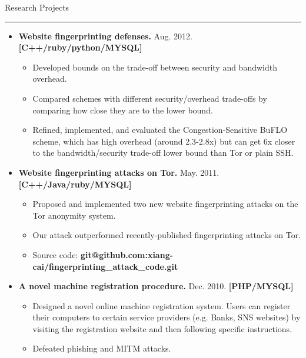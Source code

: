 \documentclass[11pt,oneside]{article}
\newenvironment{ressection}[1]{
	{\fontfamily{phv}\selectfont\Large#1}
	
	\vspace{-8pt} \rule{\textwidth}{.5pt}
	
	\vspace{-4pt}
	\begin{itemize}
	\vspace{.5pt}
}{
	\end{itemize}
}
\newcommand{\resitem}[1]{
	\vspace{2pt}
	\item \begin{flushleft} #1 \end{flushleft}
}
\begin{document}
\begin{ressection}{Research Projects}

	\resitem{\textbf{Website fingerprinting defenses.} Aug.
		2012. \hfill\textbf{[C++/ruby/python/MYSQL]} 
		\vspace{-2pt}
		\begin{small}
		
		\begin{itemize}
		\item
		Developed bounds on the trade-off between security and
		bandwidth overhead.
		\item
		Compared schemes with different
		security/overhead trade-offs by comparing how close they are
		to the lower bound. 
		\item
		Refined, implemented, and evaluated
		the Congestion-Sensitive BuFLO scheme, which has high overhead (around 2.3-2.8x) but can
		get 6x closer to the bandwidth/security trade-off lower bound
		than Tor or plain SSH.
		\end{itemize}
		
		\end{small}				
	}
	\vspace{-4pt}
	\resitem{\textbf{Website fingerprinting attacks on Tor.} May.
		2011. \hfill\textbf{[C++/Java/ruby/MYSQL]} 
		\vspace{-2pt}
		\begin{small}

		\begin{itemize}
		\item		
		Proposed and implemented two new website fingerprinting
			attacks on the Tor anonymity system.
		\item	
			Our attack outperformed recently-published fingerprinting attacks on Tor.
		\item			
			Source code: \textbf{git@github.com:xiang-cai/fingerprinting\_attack\_code.git}
		
		\end{itemize}		
		\end{small}				
	}

	\vspace{-4pt}
	\resitem{\textbf{A novel machine registration procedure.} Dec. 
		2010. \hfill\textbf{[PHP/MYSQL]}
		\vspace{-2pt}
		\begin{small}
		
		\begin{itemize}
		\item
		Designed a novel online machine
			registration system. Users can register their computers to
			certain service providers (e.g. Banks, SNS websites) by
			visiting the registration website and then following specific
			instructions.
			\item
			Defeated phishing and MITM attacks.
		\end{itemize}
		\end{small}	
	}
			

\end{ressection}
\end{document}
